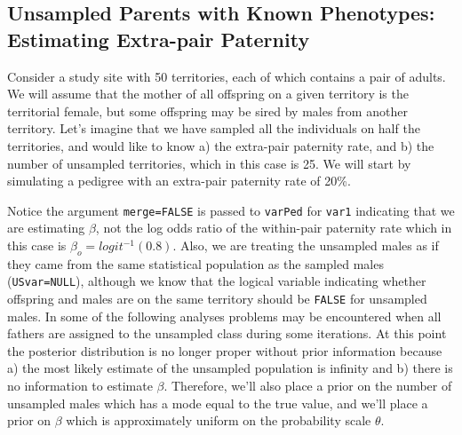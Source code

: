 \documentclass{article}
\begin{document}
\subsection{Unsampled Parents with Known Phenotypes: Estimating Extra-pair Paternity}
\label{EPP-sec}

Consider a study site with 50 territories, each of which contains a pair of adults.  We will assume that the mother of all offspring on a given territory is the territorial female, but some offspring may be sired by males from another territory.  Let's imagine that we have sampled all the individuals on half the territories, and would like to know a) the extra-pair paternity rate, and b) the number of unsampled territories, which in this case is 25. We will start by simulating a pedigree with an extra-pair paternity rate of 20\%.

\begin{Schunk}
\end{Schunk}

Notice the argument \texttt{merge=FALSE} is passed to \texttt{varPed} for \texttt{var1} indicating that we are estimating $\beta$,  not the log odds ratio of the within-pair paternity rate which in this case is $\beta_{o}=logit^{-1}(0.8)$. Also, we are treating the unsampled males as if they came from the same statistical population as the sampled males (\texttt{USvar=NULL}), although we know that the logical variable indicating whether offspring and males are on the same territory should be \texttt{FALSE} for unsampled males. In some of the following analyses problems may be encountered when all fathers are assigned to the unsampled class during some iterations. At this point the posterior distribution is no longer proper without prior information because a) the most likely estimate of the unsampled population is infinity and b) there is no information to estimate $\beta$. Therefore, we'll also place a prior on the number of unsampled males which has a mode equal to the true value, and we'll place a prior on $\beta$ which is approximately uniform on the probability scale $\theta$. 
  
\end{document}
